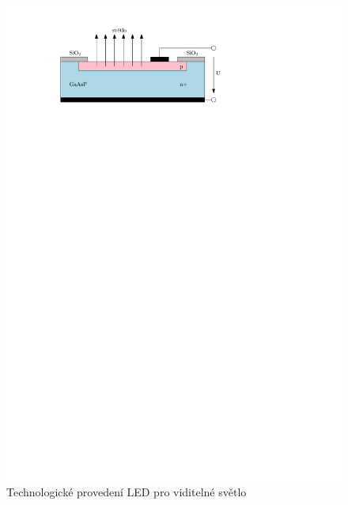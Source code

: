 \begin{figure}[!h]
    \begin{center}
        \includegraphics[scale=1]{img/led}
    \end{center}
    \caption{Technologické provedení LED pro viditelné světlo}
\end{figure}

